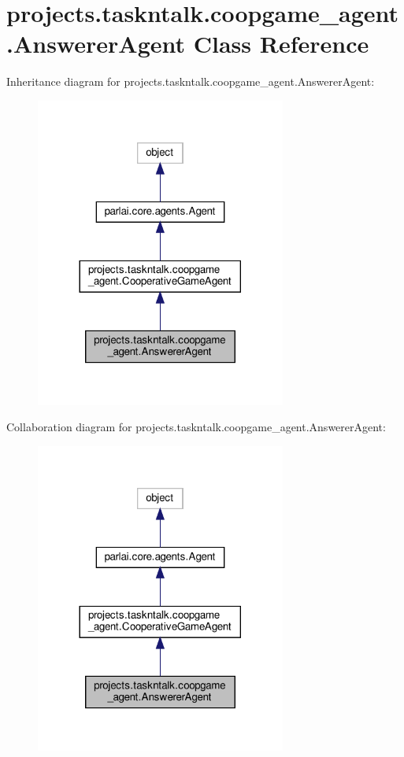 \hypertarget{classprojects_1_1taskntalk_1_1coopgame__agent_1_1AnswererAgent}{}\section{projects.\+taskntalk.\+coopgame\+\_\+agent.\+Answerer\+Agent Class Reference}
\label{classprojects_1_1taskntalk_1_1coopgame__agent_1_1AnswererAgent}


Inheritance diagram for projects.\+taskntalk.\+coopgame\+\_\+agent.\+Answerer\+Agent\+:
\nopagebreak
\begin{figure}[H]
\begin{center}
\leavevmode
\includegraphics[width=233pt]{classprojects_1_1taskntalk_1_1coopgame__agent_1_1AnswererAgent__inherit__graph}
\end{center}
\end{figure}


Collaboration diagram for projects.\+taskntalk.\+coopgame\+\_\+agent.\+Answerer\+Agent\+:
\nopagebreak
\begin{figure}[H]
\begin{center}
\leavevmode
\includegraphics[width=233pt]{classprojects_1_1taskntalk_1_1coopgame__agent_1_1AnswererAgent__coll__graph}
\end{center}
\end{figure}
